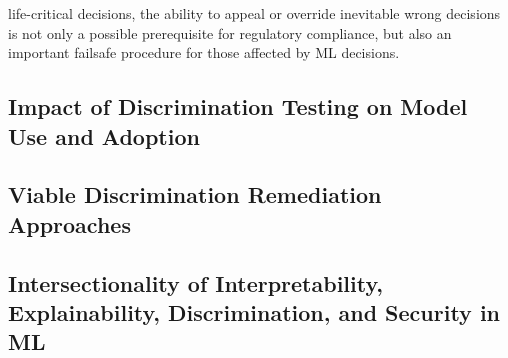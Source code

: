 \documentclass[information,article,submit,moreauthors,pdftex]{definitions/mdpi}
\begin{document}
life-critical decisions, the ability to appeal or override inevitable wrong decisions is not only a possible prerequisite for regulatory compliance, but also an important failsafe procedure for those affected by ML decisions.  

\subsection{Impact of Discrimination Testing on Model Use and Adoption}

\subsection{Viable Discrimination Remediation Approaches}

\subsection{Intersectionality of Interpretability, Explainability, Discrimination, and Security in ML}
\end{document}
